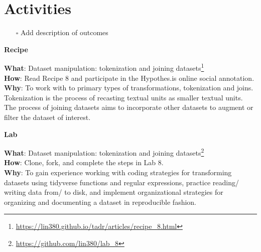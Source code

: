 \documentclass[
  letterpaper,
  DIV=11,
  numbers=noendperiod]{scrreport}
\providecommand{\tightlist}{%
  \setlength{\itemsep}{0pt}\setlength{\parskip}{0pt}}\usepackage{longtable,booktabs,array}
\theoremstyle{definition}
\theoremstyle{remark}
\DeclareRobustCommand{\href}[2]{#2\footnote{\url{#1}}}
\begin{document}
\hypertarget{activities-5}{%
\section*{Activities}\label{activities-5}}


\begin{itemize}
\tightlist
\item[$\square$]
   Add description of outcomes
\end{itemize}

\begin{tcolorbox}[enhanced jigsaw, breakable, colback=white, rightrule=.15mm, arc=.35mm, left=2mm, toprule=.15mm, leftrule=.75mm, bottomrule=.15mm, opacityback=0]

\textbf{ Recipe}

\textbf{What}:
\href{https://lin380.github.io/tadr/articles/recipe_8.html}{Dataset
manipulation: tokenization and joining datasets}\\
\textbf{How}: Read Recipe 8 and participate in the Hypothes.is online
social annotation.\\
\textbf{Why}: To work with to primary types of transformations,
tokenization and joins. Tokenization is the process of recasting textual
units as smaller textual units. The process of joining datasets aims to
incorporate other datasets to augment or filter the dataset of interest.

\end{tcolorbox}

\begin{tcolorbox}[enhanced jigsaw, breakable, colback=white, rightrule=.15mm, arc=.35mm, left=2mm, toprule=.15mm, leftrule=.75mm, bottomrule=.15mm, opacityback=0]

\textbf{ Lab}

\textbf{What}: \href{https://github.com/lin380/lab_8}{Dataset
manipulation: tokenization and joining datasets}\\
\textbf{How}: Clone, fork, and complete the steps in Lab 8.\\
\textbf{Why}: To gain experience working with coding strategies for
transforming datasets using tidyverse functions and regular expressions,
practice reading/ writing data from/ to disk, and implement
organizational strategies for organizing and documenting a dataset in
reproducible fashion.

\end{tcolorbox}
\end{document}
